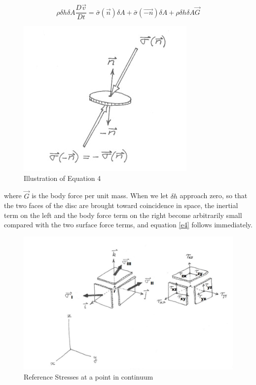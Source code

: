 \documentclass{article}
\begin{document}
{\begin{equation}
\rho \delta h\delta A\frac{D\overrightarrow{v}}{Dt} = \bar{\sigma}(\overrightarrow{n})\delta A + \bar{\sigma}(\overrightarrow{-n})\delta A + \rho \delta h\delta A \overrightarrow{G} \label{e5}
\end{equation}

\begin{figure}[h!]
\centering
\includegraphics[scale=.8]{eq4.jpg}
\caption{Illustration of Equation 4}
\label{fig:Ill_of_eq4}
\end{figure}

where $\overrightarrow{G}$ is the body force per unit mass. When we let $\delta h$ approach zero, so that the two faces of the disc are brought toward coincidence in space, the inertial term on the left and the body force term on the right become arbitrarily small compared with the two surface force terms, and equation \ref{e4} follows immediately.

\begin{figure}[h!]
\centering
\includegraphics[scale=.6]{Reference Stresses at a point in continuum.jpg}
\caption{Reference Stresses at a point in continuum}
\label{fig:ref_strss_at_p_contnm}
\end{figure}

}
\end{document}
